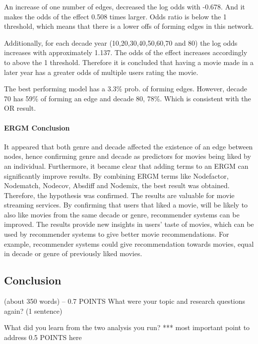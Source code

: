 \documentclass[
  english,
  man,floatsintext]{apa6}
\let\oldparagraph\paragraph
\renewcommand{\paragraph}[1]{\oldparagraph{#1}\mbox{}}
\begin{document}
An increase of one number of edges, decreased the log odds with -0.678. And it makes the odds of the effect 0.508 times larger. Odds ratio is below the 1 threshold, which means that there is a lower offs of forming edges in this network.

Additionally, for each decade year (10,20,30,40,50,60,70 and 80) the log odds increases with approximately 1.137. The odds of the effect increases accordingly to above the 1 threshold. Therefore it is concluded that having a movie made in a later year has a greater odds of multiple users rating the movie.

The best performing model has a 3.3\% prob. of forming edges. However, decade 70 has 59\% of forming an edge and decade 80, 78\%. Which is consistent with the OR result.

\hypertarget{ergm-conclusion}{%
\paragraph{ERGM Conclusion}\label{ergm-conclusion}}

It appeared that both genre and decade affected the existence of an edge between nodes, hence confirming genre and decade as predictors for movies being liked by an individual. Furthermore, it became clear that adding terms to an ERGM can significantly improve results. By combining ERGM terms like Nodefactor, Nodematch, Nodecov, Absdiff and Nodemix, the best result was obtained. Therefore, the hypothesis was confirmed.
The results are valuable for movie streaming services. By confirming that users that liked a movie, will be likely to also like movies from the same decade or genre, recommender systems can be improved. The results provide new insights in users' taste of movies, which can be used by recommender systems to give better movie recommendations. For example, recommender systems could give recommendation towards movies, equal in decade or genre of previously liked movies.

\hypertarget{conclusion}{%
\subsection{Conclusion}\label{conclusion}}

(about 350 words) -- 0.7 POINTS
What were your topic and research questions again? (1 sentence)

What did you learn from the two analysis you run? *** most important point to
address 0.5 POINTS here
\end{document}
